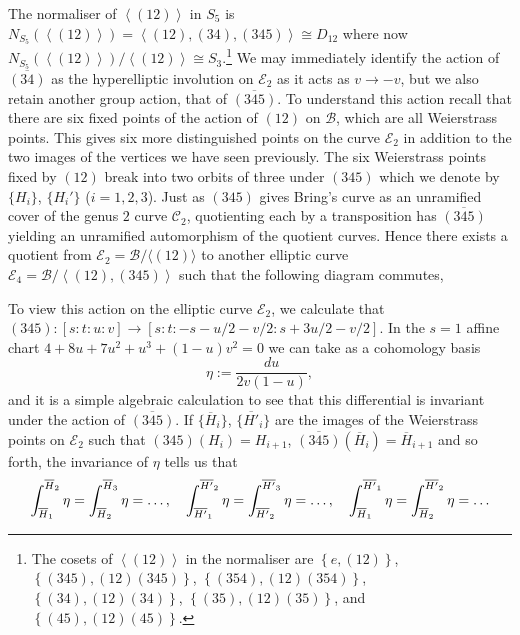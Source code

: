 \documentclass{amsart}
\newcommand{\pbrace}[1]{\left\{ #1 \right\} }
\newcommand{\pangle}[1]{\left\langle #1 \right\rangle}
\begin{document}
The normaliser of $\pangle{(12)}$ in $S_5$ is $N_{S_5}(\pangle{(12)})=\pangle{(12),(34),(345)}\cong D_{12}$ where now
$N_{S_5}(\pangle{(12)})/\pangle{(12)}\cong S_3$.\footnote{The cosets of $\pangle{(12)}$ in the normaliser are $\pbrace{e, (12)}$,
$\pbrace{(345), (12)(345)}$,
$\pbrace{(354), (12)(354)}$,
$\pbrace{(34), (12)(34)}$,
$\pbrace{(35), (12)(35)}$, and $\pbrace{(45), (12)(45)}$. }
We may immediately identify the action of $\overline{(34)}$ as the hyperelliptic involution on $\mathcal{E}_2$ as it acts as $v \to -v$, but we also retain another group action, that of $\overline{(345)}$.
To understand this action recall that there are six fixed points of the action of $(12)$ on $\mathcal{B}$, which are all Weierstrass points. This gives six more distinguished points on the curve $\mathcal{E}_2$ in addition to the two images of the vertices we have seen previously.  
The six Weierstrass points fixed by $(12)$ break into two orbits of three
under $(345)$
which we denote by $\{H_i\}$, $\{H_i'\}$ ($i=1,2,3$). 
Just as $(345)$ gives Bring's curve as an unramified cover of the genus $2$ curve $\mathcal{C}_2$, quotienting each by a transposition has $\overline{(345)}$  yielding an unramified automorphism of the quotient curves. Hence there exists a quotient from $\mathcal{E}_2=\mathcal{B}/\langle(12)\rangle$ to another elliptic curve
$\mathcal{E}_4 = \mathcal{B}/\pangle{(12),(345)}$ such that the following diagram commutes,
\begin{center}
\end{center}
To view this action on the elliptic curve $\mathcal{E}_2$, we calculate that $(345): [s:t:u:v] \to [s:t: -s-u/2-v/2 : s+3u/2-v/2]$. In the $s=1$ affine chart $4 + 8u + 7 u^2 + u^3 + (1 - u) v^2=0$ we can take as a cohomology basis 
\[
{\eta:=\frac{du}{2v(1-u)}} ,
\]
and it is a simple algebraic calculation to see that this differential is invariant under the action of $\overline{(345)}$. If $\{\overline{H}_i\}$,
$\{\overline{H'}_i\}$
are the images of the Weierstrass points on $\mathcal{E}_2$ such that
${(345)}({H}_i)={H}_{i+1}$, $\overline{(345)}(\overline{H}_i)=\overline{H}_{i+1}$ and so forth, the invariance of $\eta$ tells us that $$\int_{\overline{H}_1}\sp{\overline{H}_{2}}\eta=
\int_{\overline{H}_2}\sp{\overline{H}_{3}}\eta=\ldots,\quad
\int_{\overline{H'}_1}\sp{\overline{H'}_{2}}\eta=
\int_{\overline{H'}_2}\sp{\overline{H'}_{3}}\eta=\ldots,\quad
\int_{\overline{H}_1}\sp{\overline{H'}_{1}}\eta=
\int_{\overline{H}_2}\sp{\overline{H'}_{2}}\eta=\ldots
$$
\end{document}
